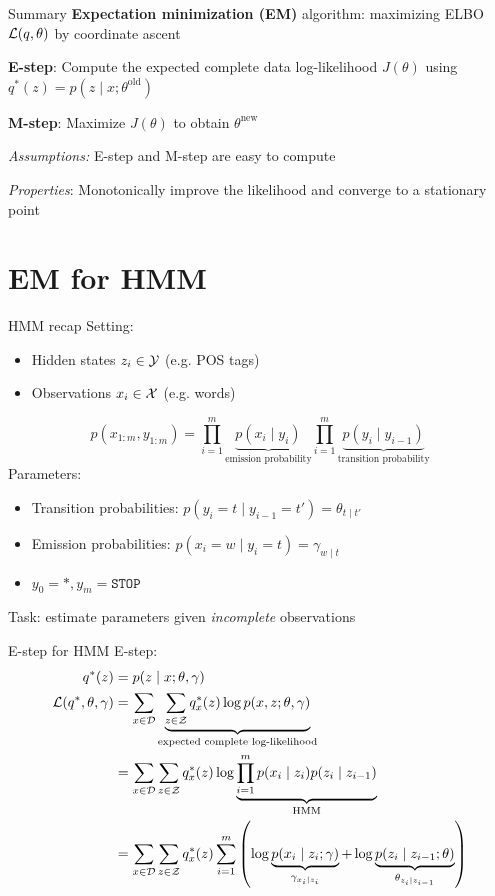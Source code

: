 \documentclass[usenames,dvipsnames,notes]{beamer}
\begin{document}
\begin{frame}
    {Summary}
    \textbf{Expectation minimization (EM)} algorithm:
    maximizing ELBO $\mathcal{L}(q, \theta)$ by coordinate ascent

    \textbf{E-step}:
    Compute the expected complete data log-likelihood $J(\theta)$
    using
    $q^*(z) = p(z\mid x; \theta^{\text{old}})$

    \textbf{M-step}:
        Maximize $J(\theta)$ to obtain $\theta^{\text{new}}$
        
    \emph{Assumptions:}
    E-step and M-step are easy to compute

    \emph{Properties}:
        Monotonically improve the likelihood and converge to a stationary point
\end{frame}

\section{EM for HMM}

\begin{frame}
    {HMM recap}
    Setting:\\
    \begin{itemize}
        \item Hidden states $z_i \in \mathcal{Y}$ (e.g. POS tags)
        \item Observations $x_i\in \mathcal{X}$ (e.g. words)
    \end{itemize}
    $$
    p(x_{1:m},y_{1:m}) = \prod_{i=1}^m \underbrace{p(x_i\mid y_i)}_{\text{emission probability}}
    \prod_{i=1}^m \underbrace{p(y_i\mid y_{i-1})}_{\text{transition probability}}
    $$
    Parameters:\\
    \begin{itemize}
        \item Transition probabilities: $p(y_i=t\mid y_{i-1}=t') = \theta_{t\mid t'}$
        \item Emission probabilities: $p(x_i=w\mid y_i=t) = \gamma_{w\mid t}$
        \item $y_0=*, y_m=\texttt{STOP}$
    \end{itemize}
    Task: estimate parameters given \emph{incomplete} observations
\end{frame}

\begin{frame}
    {E-step for HMM}
    E-step: 
    \begin{align*}
        q^*(z) &= p(z\mid x; \theta, \gamma) \\
        \mathcal{L}(q^*, \theta, \gamma) &= \sum_{x\in\mathcal{D}} \underbrace{\sum_{z\in\mathcal{Z}} q^*_x(z)
        \log p(x,z;\theta,\gamma)}_\text{expected complete log-likelihood} \\
        &= \sum_{x\in\mathcal{D}} \sum_{z\in\mathcal{Z}} q^*_x(z)
        \log \underbrace{\prod_{i=1}^m p(x_i\mid z_i) p(z_i\mid z_{i-1})}_{\text{HMM}} \\
        &= \sum_{x\in\mathcal{D}} \sum_{z\in\mathcal{Z}} q^*_x(z)
        \sum_{i=1}^m \left( 
            \log \underbrace{p(x_i\mid z_i; \gamma)}_{\gamma_{x_i\mid z_i}} + 
        \log \underbrace{p(z_i\mid z_{i-1}; \theta)}_{\theta_{z_i\mid z_{i-1}}} 
         \right)
    \end{align*}
\end{frame}
\end{document}

